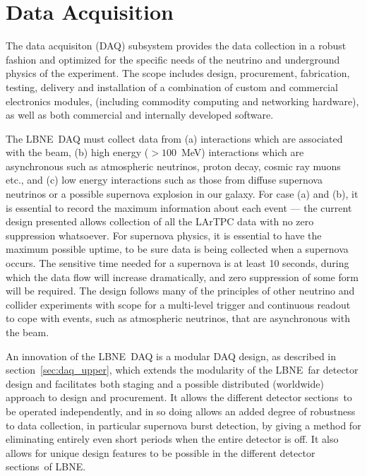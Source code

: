 

\newcommand{\LBNE}{LBNE}
\newcommand{\COMPARTMENT}{detector section}
\newcommand{\COMPARTMENTS}{detector sections}

\chapter{Data Acquisition}
\label{ch:trig}

The data acquisiton (DAQ) subsystem provides the data collection
in a robust fashion and optimized for the specific needs of the neutrino and
underground physics of the experiment.  The scope includes design,
procurement, fabrication, testing, delivery and installation of a
combination of custom and commercial electronics modules, (including
commodity computing and networking hardware), as well as both
commercial and internally developed software.

The \LBNE\ DAQ must collect data from (a) interactions which are
associated with the beam, (b) high energy ($>100$~MeV) interactions
which are asynchronous such as atmospheric neutrinos, proton decay,
cosmic ray muons etc., and (c) low energy interactions such as those
from diffuse supernova neutrinos or a possible supernova explosion in
our galaxy.  For case (a) and (b), it is essential to record the
maximum information about each event --- the current design presented
allows collection of all the LArTPC data with no zero suppression
whatsoever.  For supernova physics, it is essential to have the
maximum possible uptime, to be sure data is being collected when a
supernova occurs.
The sensitive time needed for a supernova is at least 10 seconds,
during which the data flow will increase dramatically, and zero
suppression of some form will be required.  The design follows many of
the principles of other neutrino and collider experiments with scope
for a multi-level trigger and continuous readout to cope with events,
such as atmospheric neutrinos, that are asynchronous with the beam.

An innovation of the \LBNE\ DAQ is a modular DAQ design,
as described in section~\ref{sec:daq_upper}, which extends the
modularity of the \LBNE\ far detector design and facilitates both
staging and a possible distributed (worldwide) approach to design and
procurement.   It allows the different \COMPARTMENTS\ to be
operated independently, and in so doing allows an added degree of
robustness to data collection, in particular supernova burst
detection, by giving a method for eliminating entirely even short
periods when the entire detector is off.  It also allows for unique 
design features to be possible in the different \COMPARTMENTS\ 
of \LBNE.

